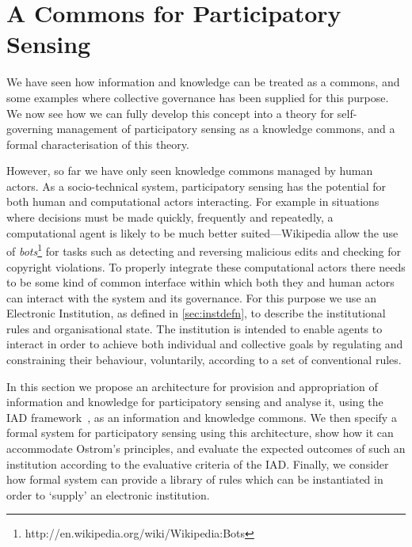 \acresetall
\chapter{A Commons for Participatory Sensing}\label{sec:iad}



We have seen how information and knowledge can be treated as a commons, and
some examples where collective governance has been supplied for this purpose.
We now see how we can fully develop this concept into a theory for self-
governing management of participatory sensing as a knowledge commons, and a
formal characterisation of this theory.

However, so far we have only seen knowledge commons managed by human actors.
As a socio-technical system, participatory sensing has the potential for both
human and computational actors interacting.  For example in situations where
decisions must be made quickly, frequently and repeatedly, a computational
agent is likely to be much better suited---Wikipedia allow the use of
\emph{bots}\footnote{http://en.wikipedia.org/wiki/Wikipedia:Bots} for tasks
such as detecting and reversing malicious edits and checking for copyright
violations. To properly integrate these computational actors there needs to be
some kind of common interface within which both they and human actors can
interact with the system and its governance. For this purpose we use an
Electronic Institution, as defined in \autoref{sec:instdefn}, to describe the
institutional rules and organisational state. The institution is intended to
enable agents to interact in order to achieve both individual and collective
goals by regulating and constraining their behaviour, voluntarily, according
to a set of conventional rules.

In this section we propose an architecture for provision and appropriation of information and knowledge for participatory sensing and analyse it, using the \ac{IAD} framework~\citep{Ostrom2005}, as an information and knowledge commons.
We then specify a formal system for participatory sensing using this architecture, show how it can accommodate Ostrom's principles,
and evaluate the expected outcomes of such an institution according to the evaluative criteria of the \ac{IAD}.
Finally, we consider how formal system can provide a library of rules which can be instantiated in order to `supply' an electronic institution. 

